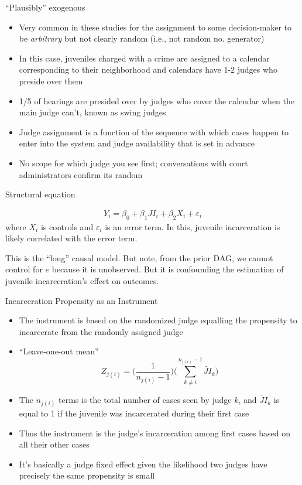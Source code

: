 \documentclass{beamer}
\begin{document}
\begin{frame}{``Plausibly'' exogenous}

	\begin{itemize}
	\item Very common in these studies for the assignment to some decision-maker to be \emph{arbitrary} but not clearly random (i.e., not random no. generator)
	\item In this case, juveniles charged with a crime are assigned to a calendar corresponding to their neighborhood and calendars have 1-2 judges who preside over them
	\item 1/5 of hearings are presided over by judges who cover the calendar when the main judge can't, known as swing judges
	\item Judge assignment is a function of the sequence with which cases happen to enter into the system and judge availability that is set in advance
	\item No scope for which judge you see first; conversations with court administrators confirm its random
	\end{itemize}
\end{frame}

\begin{frame}{Structural equation}

\begin{eqnarray*}
Y_i = \beta_0 + \beta_1 JI_i + \beta_2 X_i + \varepsilon_i
\end{eqnarray*}where $X_i$ is controls and $\varepsilon_i$ is an error term.  In this, juvenile incarceration is likely correlated with the error term.

\bigskip

This is the ``long'' causal model. But note, from the prior DAG, we cannot control for $e$ because it is unobserved. But it is confounding the estimation of juvenile incarceration's effect on outcomes.

\end{frame}

\begin{frame}{Incarceration Propensity as an Instrument}

	\begin{itemize}
	\item The instrument is based on the randomized judge equalling the propensity to incarcerate from the randomly assigned judge
	\item ``Leave-one-out mean''$$Z_{j(i)} = \bigg ( \frac{1}{n_{j(i)} - 1} \bigg ) \bigg ( \sum_{k \neq i}^{n_{j(i)}-1} \widetilde{JI}_k \bigg )$$
	\item The $n_{j(i)}$ terms is the total number of cases seen by judge $k$, and $\widetilde{JI}_k$ is equal to 1 if the juvenile was incarcerated during their first case
	\item Thus the instrument is the judge's incarceration among first cases based on all their other cases
	\item It's basically a judge fixed effect given the likelihood two judges have precisely the same propensity is small
	\end{itemize}
\end{frame}
\end{document}
